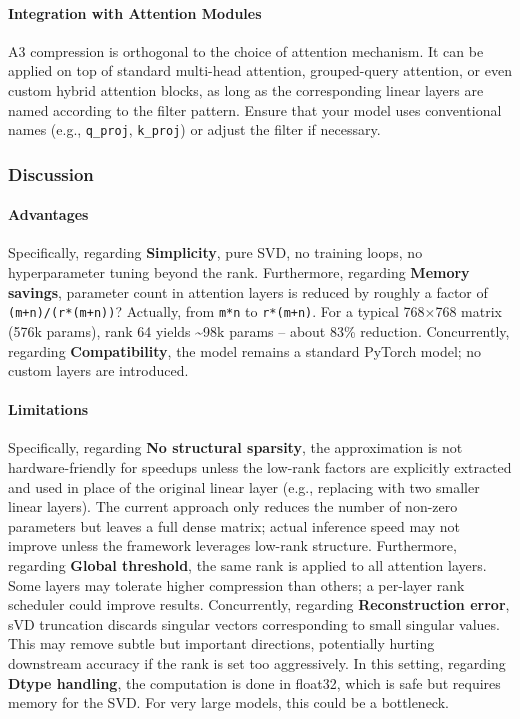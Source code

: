 \paragraph{Integration with Attention Modules}

A3 compression is orthogonal to the choice of attention mechanism. It can be applied on top of standard multi-head attention, grouped-query attention, or even custom hybrid attention blocks, as long as the corresponding linear layers are named according to the filter pattern. Ensure that your model uses conventional names (e.g., \texttt{q\_proj}, \texttt{k\_proj}) or adjust the filter if necessary.


\subsubsection*{Discussion}

\paragraph{Advantages}

Specifically, regarding \textbf{Simplicity}, pure SVD, no training loops, no hyperparameter tuning beyond the rank. Furthermore, regarding \textbf{Memory savings}, parameter count in attention layers is reduced by roughly a factor of \texttt{(m+n)/(r*(m+n))}? Actually, from \texttt{m*n} to \texttt{r*(m+n)}. For a typical 768$\times$768 matrix (576k params), rank 64 yields \textasciitilde{}98k params -- about 83\% reduction. Concurrently, regarding \textbf{Compatibility}, the model remains a standard PyTorch model; no custom layers are introduced.


\paragraph{Limitations}

Specifically, regarding \textbf{No structural sparsity}, the approximation is not hardware-friendly for speedups unless the low-rank factors are explicitly extracted and used in place of the original linear layer (e.g., replacing with two smaller linear layers). The current approach only reduces the number of non-zero parameters but leaves a full dense matrix; actual inference speed may not improve unless the framework leverages low-rank structure. Furthermore, regarding \textbf{Global threshold}, the same rank is applied to all attention layers. Some layers may tolerate higher compression than others; a per-layer rank scheduler could improve results. Concurrently, regarding \textbf{Reconstruction error}, sVD truncation discards singular vectors corresponding to small singular values. This may remove subtle but important directions, potentially hurting downstream accuracy if the rank is set too aggressively. In this setting, regarding \textbf{Dtype handling}, the computation is done in float32, which is safe but requires memory for the SVD. For very large models, this could be a bottleneck.



